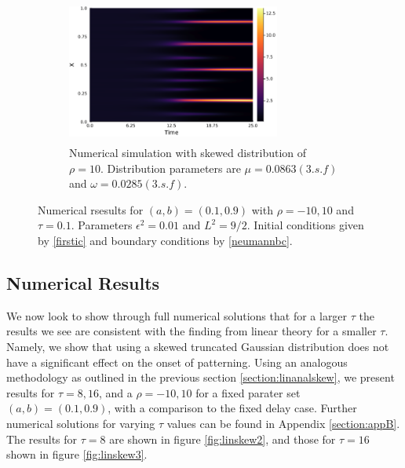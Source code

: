 \begin{figure}[H]
    \hfill
    \begin{subfigure}[t]{0.45\textwidth}
        \centering
        \includegraphics[width=7cm,height=4.75cm]{skew10.png}
        \caption{Numerical simulation with skewed distribution of $\rho=10$. Distribution parameters are $\mu=0.0863(3.s.f)$ and $\omega=0.0285(3.s.f)$.}
        \label{}
    \end{subfigure}
    \caption{Numerical rsesults for $(a,b)=(0.1,0.9)$ with $\rho=-10,10$ and $\tau=0.1$. Parameters $\epsilon^2=0.01$ and $L^2=9/2$. Initial conditions given by \eqref{firstic} and boundary conditions by \eqref{neumannbc}.}
    \label{fig:linskew1}
\end{figure}


\subsection{Numerical Results}

We now look to show through full numerical solutions that for a larger $\tau$ the results we see are consistent with the finding from linear theory for a smaller $\tau$. Namely, we show that using a skewed truncated Gaussian distribution does not have a significant effect on the onset of patterning. Using an analogous methodology as outlined in the previous section \ref{section:linanalskew}, we present results for $\tau=8,16$, and a $\rho=-10,10$ for a fixed parater set $(a,b)=(0.1,0.9)$, with a comparison to the fixed delay case. Further numerical solutions for varying $\tau$ values can be found in Appendix \ref{section:appB}. The results for $\tau=8$ are shown in figure \ref{fig:linskew2}, and those for $\tau=16$ shown in figure \ref{fig:linskew3}.

